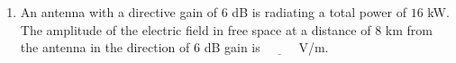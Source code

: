 \documentclass[journal,12pt,onecolumn]{IEEEtran}
\theoremstyle{remark}
\begin{document}
\begin{enumerate}
\hfill {}

\item An antenna with a directive gain of $6$ dB is radiating a total power of $16$ kW.  
The amplitude of the electric field in free space at a distance of $8$ km from the antenna in the direction of $6$ dB gain  is $\underline{\hspace{1cm}}$  V/m.  

\hfill {}










\end{enumerate}
\end{document}
